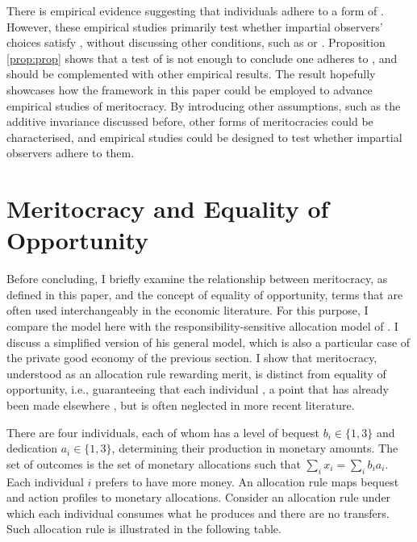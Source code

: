 There is empirical evidence suggesting that individuals adhere to a form of  \citep{andreShallowMeritocracy2025,cappelenFairnessLimitedInformation2024}. However, these empirical studies primarily test whether impartial observers' choices satisfy , without discussing other conditions, such as  or . Proposition \ref{prop:prop} shows that a test of  is not enough to conclude one adheres to , and should be complemented with other empirical results. The result hopefully showcases how the framework in this paper could be employed to advance empirical studies of meritocracy. By introducing other assumptions, such as the additive invariance discussed before, other forms of meritocracies could be characterised, and empirical studies could be designed to test whether impartial observers adhere to them.

\section{Meritocracy and Equality of Opportunity}\label{sec:eq}

Before concluding, I briefly examine the relationship between meritocracy, as defined in this paper, and the concept of equality of opportunity, terms that are often used interchangeably in the economic literature. For this purpose, I compare the model here with the responsibility-sensitive allocation model of \cite{fleurbaey2008fairness}. I discuss a simplified version of his general model, which is also a particular case of the private good economy of the previous section. I show that meritocracy, understood as an allocation rule rewarding merit, is distinct from equality of opportunity, i.e., guaranteeing that each individual , a point that has already been made elsewhere \citep{moulinFairDivisionCollective2004,fleurbaey2008fairness}, but is often neglected in more recent literature.

There are four individuals, each of whom has a level of bequest \( b_i \in \{1, 3 \} \) and dedication \( a_i \in \{ 1, 3 \} \), determining their production in monetary amounts. The set of outcomes is the set of monetary allocations such that \( \sum_i x_i = \sum_i b_i a_i \). Each individual \( i \) prefers to have more money. An allocation rule maps bequest and action profiles to monetary allocations. Consider an allocation rule under which each individual consumes what he produces and there are no transfers. Such allocation rule is illustrated in the following table.

